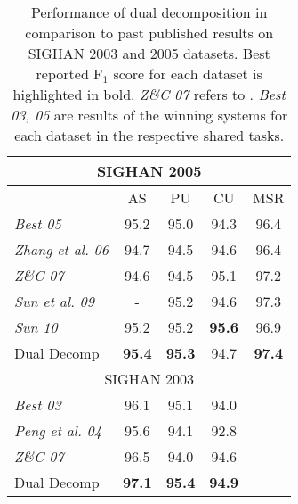 \begin{table}[h]
\centering
\begin{footnotesize}
\begin{tabular}{ l | c | c | c | c   }
\multicolumn{5}{c}{{SIGHAN 2005}} \\
\hline
                                &   AS     &  PU  & CU  & MSR  \\
\textit{Best 05}               & 95.2   &  95.0 & 94.3 & 96.4 \\
\textit{Zhang et al. 06}  & 94.7  & 94.5 & 94.6 & 96.4 \\
\textit{Z\&C 07}              & 94.6   &  94.5 & 95.1 & 97.2 \\
\textit{Sun et al. 09}      & -         &  95.2 & 94.6 & 97.3 \\
\textit{Sun 10}                & 95.2   &  95.2 & \textbf{95.6} &  96.9 \\
Dual Decomp                       & \textbf{95.4}  & \textbf{95.3} & 94.7 & \textbf{97.4} \\
\hline
\multicolumn{5}{c}{{SIGHAN 2003}} \\
\hline
\textit{Best 03}            &  96.1   & 95.1 &  \multicolumn{1}{c}{94.0} &  \\
\textit{Peng et al. 04}  & 95.6   &  94.1 &  \multicolumn{1}{c}{92.8} & \\
\textit{Z\&C 07}             & 96.5  &  94.0 &  \multicolumn{1}{c}{94.6} & \\
Dual Decomp                     & \textbf{97.1} & \textbf{95.4} &  \multicolumn{1}{c}{\textbf{94.9}} &\\
\end{tabular} 
\caption{Performance of dual decomposition in comparison to past published results on SIGHAN 2003 and 2005 datasets.  Best reported F$_{1}$ score for each dataset is highlighted in bold. \textit{Z\&C 07} refers to . \textit{Best 03, 05} are results of the winning systems for each dataset in the respective shared tasks.}\label{tbl:comparison}
\end{footnotesize}
\end{table}
%

